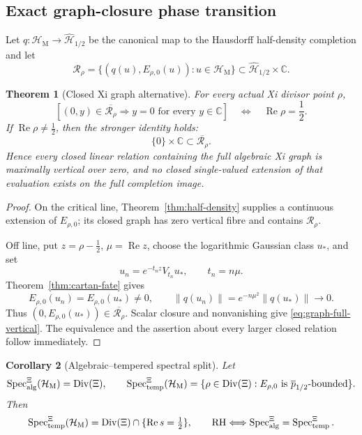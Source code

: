 \documentclass[11pt]{article}
\newtheorem{theorem}{Theorem}[section]
\newtheorem{corollary}[theorem]{Corollary}
\theoremstyle{definition}
\theoremstyle{remark}
\newcommand{\C}{\mathbb C}
\newcommand{\cH}{\mathcal H}
\newcommand{\cR}{\mathcal R}
\newcommand{\Rea}{\operatorname{Re}}
\newcommand{\Div}{\operatorname{Div}}
\newcommand{\Spec}{\operatorname{Spec}}
\begin{document}
\subsection{Exact graph-closure phase transition}

Let \(q:\cH_{\mathrm M}\to\widehat{\cH}_{1/2}\) be the canonical map to
the Hausdorff half-density completion and let
\[
 \cR_\rho=
 \{(q(u),E_{\rho,0}(u)):u\in\cH_{\mathrm M}\}
 \subset\widehat{\cH}_{1/2}\times\C.
\tag{7.13}\label{eq:xi-graph}
\]

\begin{theorem}[Closed Xi graph alternative]
\label{thm:xi-graph-closure}
For every actual Xi divisor point \(\rho\),
\[
 \left[(0,y)\in\overline{\cR_\rho}\Longrightarrow y=0
       \text{ for every }y\in\C\right]
 \quad\Longleftrightarrow\quad
 \Rea\rho=\frac12.
\tag{7.14}\label{eq:graph-single-valued}
\]
If \(\Rea\rho\ne\tfrac12\), then the stronger identity holds:
\[
                         \{0\}\times\C
                         \subset\overline{\cR_\rho}.
\tag{7.15}\label{eq:graph-full-vertical}
\]
Hence every closed linear relation containing the full algebraic Xi graph
is maximally vertical over zero, and no closed single-valued extension of
that evaluation exists on the full completion image.
\end{theorem}

\begin{proof}
On the critical line, Theorem~\ref{thm:half-density} supplies a continuous
extension of \(E_{\rho,0}\); its closed graph has zero vertical fibre and
contains \(\cR_\rho\).

Off line, put \(z=\rho-\tfrac12\), \(\mu=\Rea z\), choose the logarithmic
Gaussian class \(u_\ast\), and set
\[
 u_n=e^{-t_nz}V_{t_n}u_\ast,\qquad t_n=n\mu.
\tag{7.16}\label{eq:xi-graph-null}
\]
Theorem~\ref{thm:cartan-fate} gives
\[
 E_{\rho,0}(u_n)=E_{\rho,0}(u_\ast)\ne0,\qquad
 \|q(u_n)\|=e^{-n\mu^2}\|q(u_\ast)\|\longrightarrow0.
\]
Thus \((0,E_{\rho,0}(u_\ast))\in\overline{\cR_\rho}\).  Scalar closure
and nonvanishing give \eqref{eq:graph-full-vertical}.  The equivalence and
the assertion about every larger closed relation follow immediately.
\end{proof}

\begin{corollary}[Algebraic--tempered spectral split]
\label{cor:spectral-split}
Let
\[
\Spec_{\rm alg}^{\Xi}(\cH_{\mathrm M})=\Div(\Xi),\qquad
\Spec_{\rm temp}^{\Xi}(\cH_{\mathrm M})
=\{\rho\in\Div(\Xi):E_{\rho,0}
  \text{ is }\overline p_{1/2}\text{-bounded}\}.
\]
Then
\[
\Spec_{\rm temp}^{\Xi}(\cH_{\mathrm M})
=\Div(\Xi)\cap\{\Rea s=\tfrac12\},
\qquad
\mathrm{RH}\Longleftrightarrow
\Spec_{\rm alg}^{\Xi}=\Spec_{\rm temp}^{\Xi}.
\]
\end{corollary}
\end{document}
